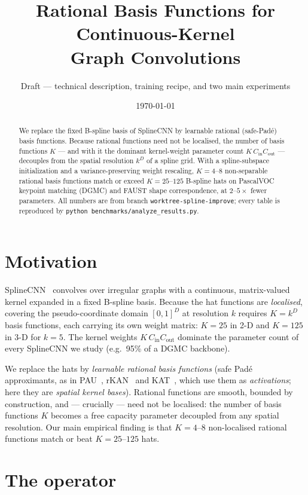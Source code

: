 \documentclass[11pt]{article}
\title{Rational Basis Functions for Continuous-Kernel\\Graph Convolutions}
\author{Draft --- technical description, training recipe, and two main experiments}
\date{\today}
\newcommand{\Cin}{C_{\mathrm{in}}}
\newcommand{\Cout}{C_{\mathrm{out}}}
\newcommand{\code}[1]{\texttt{#1}}
\begin{document}
\maketitle

\begin{abstract}
We replace the fixed B-spline basis of SplineCNN by learnable rational
(safe-Pad\'e) basis functions. Because rational functions need not be
localised, the number of basis functions $K$ --- and with it the dominant
kernel-weight parameter count $K\,\Cin\Cout$ --- decouples from the spatial
resolution $k^D$ of a spline grid. With a spline-subspace initialization and a
variance-preserving weight rescaling, $K{=}4$--$8$ non-separable rational
basis functions match or exceed $K{=}25$--$125$ B-spline hats on PascalVOC
keypoint matching (DGMC) and FAUST shape correspondence, at $2$--$5\times$
fewer parameters. All numbers are from branch
\code{worktree-spline-improve}; every table is reproduced by
\code{python benchmarks/analyze\_results.py}.
\end{abstract}

\section{Motivation}
\label{sec:motivation}

SplineCNN~\cite{fey2018splinecnn} convolves over irregular graphs with a
continuous, matrix-valued kernel expanded in a fixed B-spline basis. Because
the hat functions are \emph{localised}, covering the pseudo-coordinate domain
$[0,1]^D$ at resolution $k$ requires $K=k^D$ basis functions, each carrying
its own weight matrix: $K{=}25$ in 2-D and $K{=}125$ in 3-D for $k{=}5$. The
kernel weights $K\,\Cin\Cout$ dominate the parameter count of every SplineCNN
we study (e.g.\ 95\% of a DGMC backbone).

We replace the hats by \emph{learnable rational basis functions} (safe Pad\'e
approximants, as in PAU~\cite{molina2020pade}, rKAN~\cite{aghaei2024rkan} and
KAT~\cite{yang2025kat}, which use them as \emph{activations}; here they are
\emph{spatial kernel bases}). Rational functions are smooth, bounded by
construction, and --- crucially --- need not be localised: the number of basis
functions $K$ becomes a free capacity parameter decoupled from any spatial
resolution. Our main empirical finding is that $K{=}4$--$8$ non-localised
rational functions match or beat $K{=}25$--$125$ hats.

\section{The operator}
\label{sec:operator}
\end{document}
